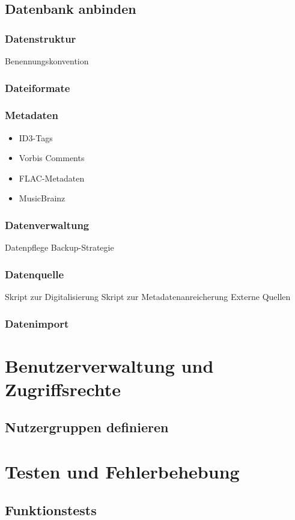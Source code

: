 \documentclass[12pt,a4paper]{report}
\begin{document}
  \subsection{Datenbank anbinden}
    \subsubsection{Datenstruktur}
    Benennungskonvention
  \subsubsection{Dateiformate}
  \subsubsection{Metadaten}
    \begin{itemize}
      \item ID3-Tags
      \item Vorbis Comments
      \item FLAC-Metadaten
      \item MusicBrainz
    \end{itemize}
  \subsubsection{Datenverwaltung}
    Datenpflege
    Backup-Strategie
  \subsubsection{Datenquelle}
    Skript zur Digitalisierung
    Skript zur Metadatenanreicherung
    Externe Quellen
  \subsubsection{Datenimport}
\section{Benutzerverwaltung und Zugriffsrechte}
  \subsection{Nutzergruppen definieren}
\section{Testen und Fehlerbehebung}
  \subsection{Funktionstests}
\end{document}
